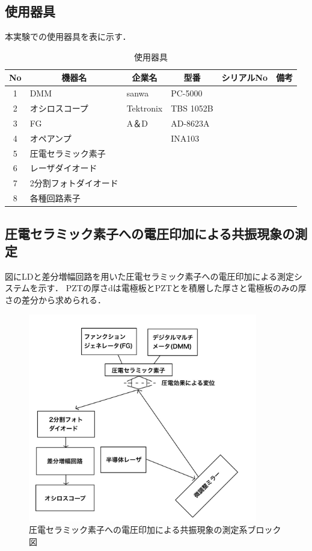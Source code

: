 \documentclass{ltjsarticle}
\begin{document}
	\subsection{使用器具}
		本実験での使用器具を表に示す．
		\begin{table}[H]
		\begin{center}
		\caption{使用器具}
		\label{tab:used}
		\begin{tabular}{clllll} \toprule
		No&\multicolumn{1}{c}{機器名}&\multicolumn{1}{c}{企業名}&\multicolumn{1}{c}{型番}&\multicolumn{1}{c}{シリアルNo}&\multicolumn{1}{c}{備考}\\
		\hline
		1&DMM&sanwa&PC-5000&\\
		2&オシロスコープ&Tektronix&TBS 1052B&\\
		3&FG&A＆D&AD-8623A&\\
		4&オペアンプ&&INA103&\\
		5&圧電セラミック素子&&&\\
		6&レーザダイオード&&&\\
		7&2分割フォトダイオード&&&\\
		8&各種回路素子&&&\\
		\bottomrule
		\end{tabular}
		\end{center}
		\end{table}

	\subsection{圧電セラミック素子への電圧印加による共振現象の測定}
		図にLDと差分増幅回路を用いた圧電セラミック素子への電圧印加による測定システムを示す．
		PZTの厚さdは電極板とPZTとを積層した厚さと電極板のみの厚さの差分から求められる．
		\begin{figure}[H]
		\centering
		\includegraphics[width = 10cm]{figs/IMG_0321.JPG}
		\caption{圧電セラミック素子への電圧印加による共振現象の測定系ブロック図}
		\label{fig:圧電セラミック素子測定系}
		\end{figure}
\end{document}

